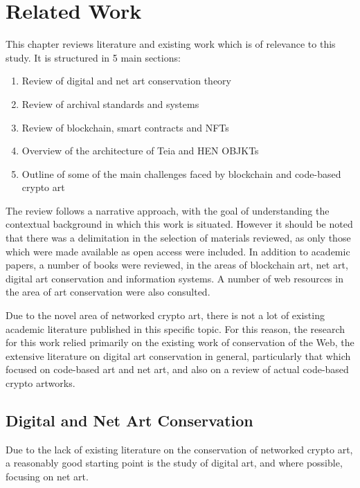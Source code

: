 \chapter{Related Work}
\label{chap:related_work}

This chapter reviews literature and existing work which is of relevance to this study. It is structured in 5 main sections:

\begin{enumerate}
    \item Review of digital and net art conservation theory
    \item Review of archival standards and systems
    \item Review of blockchain, smart contracts and NFTs
    \item Overview of the architecture of Teia and HEN OBJKTs
    \item Outline of some of the main challenges faced by blockchain and code-based crypto art
\end{enumerate}

\vspace{0.5cm}

The review follows a narrative approach, with the goal of understanding the contextual background in which this work is situated. However it should be noted that there was a delimitation in the selection of materials reviewed, as only those which were made available as open access were included. In addition to academic papers, a number of books were reviewed, in the areas of blockchain art, net art, digital art conservation and information systems. A number of web resources in the area of art conservation were also consulted. 

Due to the novel area of networked crypto art, there is not a lot of existing academic literature published in this specific topic. For this reason, the research for this work relied primarily on the existing work of conservation of the Web, the extensive literature on digital art conservation in general, particularly that which focused on code-based art and net art, and also on a review of actual code-based crypto artworks.

\section{Digital and Net Art Conservation}

Due to the lack of existing literature on the conservation of networked crypto art, a reasonably good starting point is the study of digital art, and where possible, focusing on net art.

